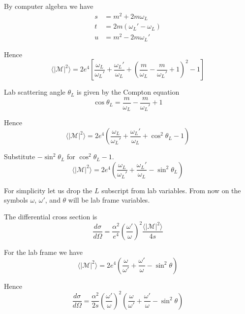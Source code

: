 By computer algebra we have
\begin{equation*}
\begin{aligned}
s&=m^2+2m\omega_L
\\
t&=2m(\omega_L' - \omega_L)
\\
u&=m^2-2 m \omega_L'
\end{aligned}
\end{equation*}

Hence
\begin{equation*}
\langle|\mathcal{M}|^2\rangle=2e^4
\left[
\frac{\omega_L}{\omega_L'}+\frac{\omega_L'}{\omega_L}
+\left(\frac{m}{\omega_L}-\frac{m}{\omega_L'}+1\right)^2-1
\right]
\end{equation*}

Lab scattering angle $\theta_L$ is given by the Compton equation
\begin{equation*}
\cos\theta_L=\frac{m}{\omega_L}-\frac{m}{\omega_L'}+1
\end{equation*}

Hence
\begin{equation*}
\langle|\mathcal{M}|^2\rangle
=2e^4\left(\frac{\omega_L}{\omega_L'}+\frac{\omega_L'}{\omega_L}+\cos^2\theta_L-1\right)
\end{equation*}

Substitute $-\sin^2\theta_L$ for $\cos^2\theta_L-1$.
\begin{equation*}
\langle|\mathcal{M}|^2\rangle
=2e^4\left(\frac{\omega_L}{\omega_L'}+\frac{\omega_L'}{\omega_L}-\sin^2\theta_L\right)
\end{equation*}

For simplicity let us drop the $L$ subscript from lab variables.
From now on the symbols $\omega$, $\omega'$, and $\theta$ will be lab frame variables.

\bigskip
The differential cross section is
\begin{equation*}
\frac{d\sigma}{d\Omega}
=\frac{\alpha^2}{e^4}
\left(\frac{\omega'}{\omega}\right)^2
\frac{\langle|\mathcal{M}|^2\rangle}{4s}
\end{equation*}

For the lab frame we have
\begin{equation*}
\langle|\mathcal{M}|^2\rangle
=2e^4\left(
\frac{\omega}{\omega'}+\frac{\omega'}{\omega}-\sin^2\theta
\right)
\end{equation*}

Hence
\begin{equation*}
\frac{d\sigma}{d\Omega}
=\frac{\alpha^2}{2s}
\left(\frac{\omega'}{\omega}\right)^2
\left(
\frac{\omega}{\omega'}+\frac{\omega'}{\omega}-\sin^2\theta
\right)
\end{equation*}

